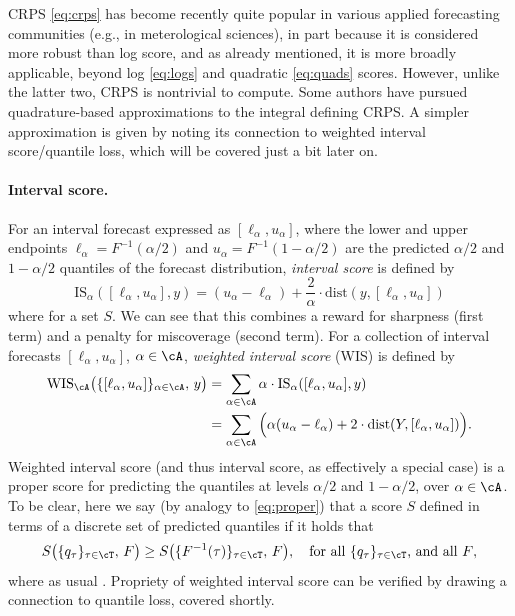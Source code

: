 \documentclass{article}
\begin{document}
CRPS \eqref{eq:crps} has become recently quite popular in various applied
forecasting communities (e.g., in meterological sciences), in part because it is
considered more robust than log score, and as already mentioned, it is more
broadly applicable, beyond log \eqref{eq:logs} and quadratic \eqref{eq:quads}
scores. However, unlike the latter two, CRPS is nontrivial to compute. Some
authors have pursued quadrature-based approximations to the integral defining
CRPS. A simpler approximation is given by noting its connection to weighted
interval score/quantile loss, which will be covered just a bit later on.

\paragraph{Interval score.}

For an interval forecast expressed as $[\ell_\alpha, u_\alpha]$, where the lower
and upper endpoints $\ell_\alpha = F^{-1}(\alpha/2)$ and $u_\alpha =
F^{-1}(1-\alpha/2)$ are the predicted $\alpha/2$ and $1-\alpha/2$ quantiles of
the forecast distribution, \emph{interval score} is defined by 
\[
\mathrm{IS}_\alpha( [\ell_\alpha, u_\alpha], y) = 
(u_\alpha - \ell_\alpha) + \frac{2}{\alpha} \cdot
\mathrm{dist}(y, [\ell_\alpha, u_\alpha])
\]
where  for a set $S$. We can
see that this combines a reward for sharpness (first term) and a penalty for 
miscoverage (second term). For a collection of interval forecasts
$[\ell_\alpha, u_\alpha]$, $\alpha \in \cA$, \emph{weighted interval score}
(WIS) is defined by
\begin{align}
\nonumber
\mathrm{WIS}_\cA \big( \{[\ell_\alpha, u_\alpha]\}_{\alpha \in \cA}, \, y \big)  
&= \sum_{\alpha \in \cA} \alpha \cdot \mathrm{IS}_\alpha( [\ell_\alpha,
  u_\alpha], y) \\
\label{eq:wis}
&=\sum_{\alpha \in \cA} \Big(\alpha (u_\alpha - \ell_\alpha) + 2 \cdot
  \mathrm{dist}(Y, [\ell_\alpha, u_\alpha]) \Big).
\end{align}
Weighted interval score (and thus interval score, as effectively a special case)
is a proper score for predicting the quantiles at levels $\alpha/2$ and
$1-\alpha/2$, over $\alpha \in \cA$. To be clear, here we say (by analogy to 
\eqref{eq:proper}) that a score $S$ defined in terms of a discrete set of
predicted quantiles  if it holds that   
\begin{equation}
\label{eq:proper_q}
S \big( \{q_\tau\}_{\tau \in \cT}, \, F \big) \geq S \big(
\{F^{-1}(\tau)\}_{\tau \in \cT}, \, F \big), \quad \text{for all
$\{q_\tau\}_{\tau \in \cT}$, and all $F$},    
\end{equation}
where as usual . Propriety of weighted interval score  
can be verified by drawing a connection to quantile loss, covered shortly.  
\end{document}
